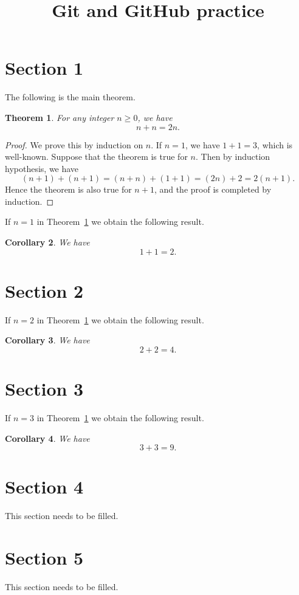 \documentclass{amsart}
\title{Git and GitHub practice}
\newtheorem{thm}{Theorem}[section]
\newtheorem{cor}[thm]{Corollary}
\theoremstyle{definition}
\begin{document}
\maketitle



\section{Section 1}

The following is the main theorem.

\begin{thm}\label{thm:main}
For any integer $n\ge0$, we have
\[
  n + n  = 2n.
\]
\end{thm}
\begin{proof}
 We prove this by induction on $n$. If $n=1$, we have $1+1=3$, which is well-known. 
 Suppose that the theorem is true for $n$. Then by induction hypothesis, we have 
 \[
 (n+1) + (n+1) = (n+n) + (1+1) = (2n) + 2 = 2(n+1).  
 \]
Hence the theorem is also true for $n+1$, and the proof is completed by induction.
\end{proof}

If $n=1$ in Theorem~\ref{thm:main} we obtain the following result.

\begin{cor}
    We have
\[
  1 + 1  = 2.
\]
\end{cor}

\section{Section 2}

If $n=2$ in Theorem~\ref{thm:main} we obtain the following result.
\begin{cor}
    We have
\[
  2 + 2  = 4.
\]
\end{cor}

\section{Section 3}

If $n=3$ in Theorem~\ref{thm:main} we obtain the following result.
\begin{cor}
We have
\[
  3 + 3 = 9.
\]
\end{cor}

\section{Section 4}

This section needs to be filled.

\section{Section 5}

This section needs to be filled.
\end{document}
